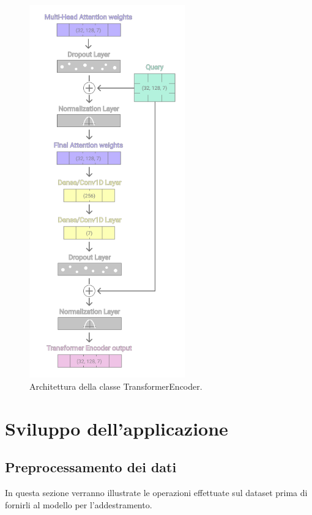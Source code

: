 \documentclass[12pt,a4paper,twoside,openright]{book}
\begin{document}
\begin{figure}[H]
\centering
\includegraphics[width=0.6\textwidth]{images/transformer.png}
\caption{Architettura della classe TransformerEncoder.}
\label{fig:rapp_file}
\end{figure}

%
%

\chapter{Sviluppo dell'applicazione}

\section{Preprocessamento dei dati}

In questa sezione verranno illustrate le operazioni effettuate sul dataset prima di fornirli al modello per l'addestramento.
\end{document}
